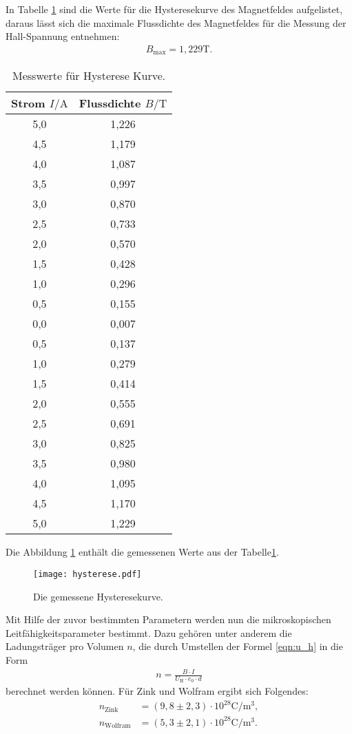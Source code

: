 In Tabelle \ref{tab:hys} sind die Werte für die Hysteresekurve des Magnetfeldes aufgelistet, daraus lässt sich die maximale Flussdichte des Magnetfeldes
für die Messung der Hall-Spannung entnehmen:
\begin{align*}
 B_\mathrm{max}=1,229\si{\tesla}.
\end{align*}
\begin{table}
  \centering
  \caption{Messwerte für Hysterese Kurve.}
  \label{tab:hys}
  \begin{tabular}{c c}
    \toprule
    Strom $I/\si{\ampere}$ & Flussdichte $B/\si{\tesla}$\\
    \midrule
    5,0   &  1,226 \\
    4,5   &  1,179 \\
    4,0   &  1,087 \\
    3,5   &  0,997 \\
    3,0   &  0,870 \\
    2,5   &  0,733 \\
    2,0   &  0,570 \\
    1,5   &  0,428 \\
    1,0   &  0,296 \\
    0,5   &  0,155 \\
    0,0   &  0,007 \\
    0,5   &  0,137 \\
    1,0   &  0,279 \\
    1,5   &  0,414 \\
    2,0   &  0,555 \\
    2,5   &  0,691 \\
    3,0   &  0,825 \\
    3,5   &  0,980 \\
    4,0   &  1,095 \\
    4,5   &  1,170 \\
    5,0   &  1,229 \\
    \bottomrule
  \end{tabular}
\end{table}
\FloatBarrier
Die Abbildung \ref{fig:hys} enthält die gemessenen Werte aus der Tabelle\ref{tab:hys}.
\begin{figure}
  \centering
  \texttt{[image: hysterese.pdf]}
  \caption{Die gemessene Hysteresekurve.}
  \label{fig:hys}
\end{figure}
\FloatBarrier
Mit Hilfe der zuvor bestimmten Parametern werden nun die mikroskopischen Leitfähigkeitsparameter
bestimmt.
Dazu gehören unter anderem die Ladungsträger pro Volumen $n$, die durch Umstellen der Formel \eqref{eqn:u_h} in die Form
\begin{align}
  n=\frac{B \cdot I}{U_\mathrm{H}\cdot e_0 \cdot d}
\end{align}
berechnet werden können.
Für Zink und Wolfram ergibt sich Folgendes:
\begin{align*}
n_\mathrm{Zink}&=(9,8\pm2,3)\cdot10^{28}\si{\coulomb\per\meter\tothe{3}},\\
n_\mathrm{Wolfram}&=(5,3\pm2,1)\cdot10^{28}\si{\coulomb\per\meter\tothe{3}}.
\end{align*}

